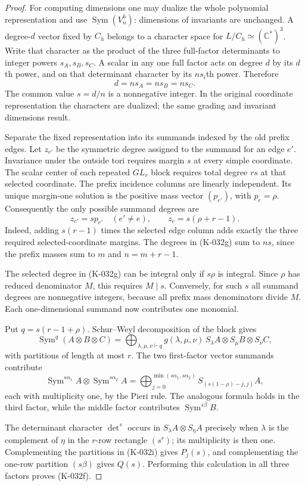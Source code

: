 \begin{proof}
For computing dimensions one may dualize the whole polynomial
representation and use $\operatorname{Sym}(V_n^h)$: dimensions of
invariants are unchanged.  A degree-$d$ vector fixed by $C_h$ belongs
to a character space for $L/C_h\simeq(\mathbb C^*)^3$.  Write that
character as the product of the three full-factor determinants to
integer powers $s_A,s_B,s_C$.  A scalar in any one full factor acts
on degree $d$ by its $d$th power, and on that determinant character
by its $n s_i$th power.  Therefore
\[
                         d=n s_A=n s_B=n s_C.
\]
The common value $s=d/n$ is a nonnegative integer.  In the original
coordinate representation the characters are dualized; the same
grading and invariant dimensions result.

Separate the fixed representation into its summands indexed by the
old prefix edges.  Let $z_{e'}$ be the symmetric degree assigned to
the summand for an edge $e'$.  Invariance under the outside tori
requires margin $s$ at every simple coordinate.  The scalar center
of each repeated $GL_r$ block requires total degree $rs$ at that
selected coordinate.  The prefix incidence columns are linearly
independent.  Its unique margin-one solution is the positive mass
vector $(p_{e'})$, with $p_e=\rho$.  Consequently the only possible
summand degrees are
\[
 z_{e'}=s p_{e'}\quad(e'\ne e),\qquad
 z_e=s(\rho+r-1).                              \tag{K-032g}
\]
Indeed, adding $s(r-1)$ times the selected edge column adds exactly
the three required selected-coordinate margins.  The degrees in
(K-032g) sum to $ns$, since the prefix masses sum to $m$ and
$n=m+r-1$.

The selected degree in (K-032g) can be integral only if $s\rho$ is
integral.  Since $\rho$ has reduced denominator $M$, this requires
$M\mid s$.  Conversely, for such $s$ all summand degrees are
nonnegative integers, because all prefix mass denominators divide
$M$.  Each one-dimensional summand now contributes one monomial.

Put $q=s(r-1+\rho)$.  Schur--Weyl decomposition of the block gives
\[
 \operatorname{Sym}^{q}(A\otimes B\otimes C)
   =\bigoplus_{\lambda,\mu,\nu\vdash q}
       g(\lambda,\mu,\nu)\,
       S_\lambda A\otimes S_\mu B\otimes S_\nu C,
                                                        \tag{K-032h}
\]
with partitions of length at most $r$.  The two first-factor vector
summands contribute
\[
 \operatorname{Sym}^{s\alpha_1}A\otimes
 \operatorname{Sym}^{s\alpha_2}A
 =\bigoplus_{j=0}^{\min(s\alpha_1,s\alpha_2)}
       S_{(s(1-\rho)-j,j)}A,
                                                        \tag{K-032i}
\]
each with multiplicity one, by the Pieri rule.  The analogous formula
holds in the third factor, while the middle factor contributes
$\operatorname{Sym}^{s\beta}B$.

The determinant character $\det^s$ occurs in
$S_\lambda A\otimes S_\eta A$ precisely when $\lambda$ is the
complement of $\eta$ in the $r$-row rectangle $(s^r)$; its
multiplicity is then one.  Complementing the partitions in
(K-032i) gives $P_j(s)$, and complementing the one-row partition
$(s\beta)$ gives $Q(s)$.  Performing this calculation in all three
factors proves (K-032f).
\end{proof}


